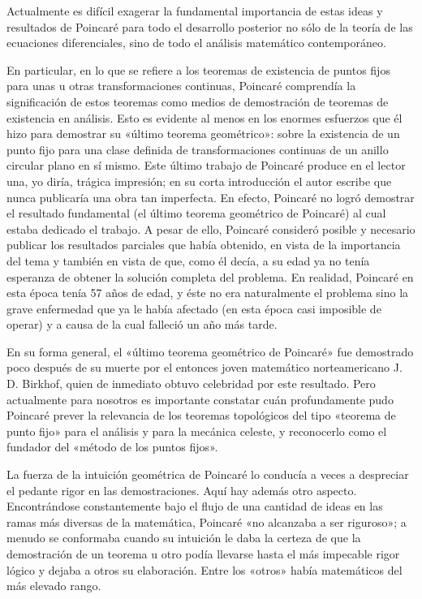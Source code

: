 \documentclass[a4paper, 12pt]{article}
\begin{document}
Actualmente es difícil exagerar la fundamental importancia de estas ideas y resultados de Poincaré  para todo el desarrollo posterior no sólo de la teoría de las ecuaciones diferenciales, sino de todo el análisis matemático contemporáneo.

En particular, en lo que se refiere a los teoremas de existencia de puntos fijos para unas u otras  transformaciones continuas, Poincaré comprendía la significación de estos teoremas como medios de demostración de teoremas de existencia en análisis. Esto es evidente al menos en los enormes esfuerzos que él hizo para demostrar su «último teorema geométrico»: sobre la existencia de un punto fijo para una clase definida de transformaciones continuas de un anillo circular plano en sí mismo. Este último trabajo de Poincaré produce  en el lector una, yo diría, trágica impresión; en su  corta introducción el autor escribe que nunca publicaría una obra tan imperfecta. En efecto, Poincaré no logró demostrar el resultado fundamental (el último teorema geométrico de Poincaré) al cual estaba dedicado  el trabajo. A pesar de ello, Poincaré consideró posible y necesario publicar los resultados parciales que había obtenido, en vista de la importancia del tema y también en vista de que, como él decía, a su edad ya  no tenía esperanza de obtener la solución completa del problema. En realidad, Poincaré en esta época tenía 57 años de edad, y éste no era naturalmente el problema sino la grave enfermedad que ya le había afectado (en esta época casi imposible de operar) y a causa de la  cual falleció un año más tarde.

En su forma general, el «último teorema geométrico de Poincaré» fue demostrado poco después de su muerte por el entonces joven matemático norteamericano J. D. Birkhof, quien de inmediato obtuvo  celebridad por este resultado. Pero actualmente para nosotros es
importante constatar cuán profundamente pudo Poincaré prever la relevancia de los teoremas topológicos del tipo «teorema de punto fijo» para el análisis y para
la mecánica celeste, y reconocerlo como el fundador 
del «método de los puntos fijos».

La fuerza de la intuición geométrica de Poincaré lo conducía a veces a despreciar el pedante rigor
en las demostraciones. Aquí hay además otro aspecto. Encontrándose constantemente bajo el flujo de una cantidad de ideas en las ramas más diversas de la matemática, Poincaré «no alcanzaba a ser riguroso»; a menudo se conformaba cuando su intuición le daba la certeza de que la demostración de un teorema u otro podía
llevarse hasta el más impecable rigor lógico y dejaba a otros su elaboración. Entre los «otros» había matemáticos del más elevado rango.
\end{document}
